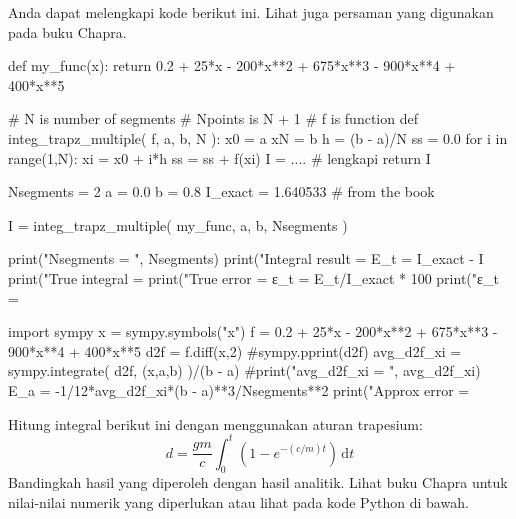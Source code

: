 Anda dapat melengkapi kode berikut ini. Lihat juga persaman yang digunakan pada
buku Chapra.
\begin{pythoncode}
def my_func(x):
    return 0.2 + 25*x - 200*x**2 + 675*x**3 - 900*x**4 + 400*x**5

# N is number of segments
# Npoints is N + 1
# f is function
def integ_trapz_multiple( f, a, b, N ):
    x0 = a
    xN = b
    h = (b - a)/N
    ss = 0.0
    for i in range(1,N):
        xi = x0 + i*h
        ss = ss + f(xi)
    I = .... # lengkapi
    return I

Nsegments = 2
a = 0.0
b = 0.8
I_exact = 1.640533 # from the book

I = integ_trapz_multiple( my_func, a, b, Nsegments )

print("Nsegments = ", Nsegments)
print("Integral result = %
E_t = I_exact - I
print("True integral   = %
print("True error      = %
ε_t = E_t/I_exact * 100
print("ε_t             = %

import sympy
x = sympy.symbols("x")
f = 0.2 + 25*x - 200*x**2 + 675*x**3 - 900*x**4 + 400*x**5
d2f = f.diff(x,2)
#sympy.pprint(d2f)
avg_d2f_xi = sympy.integrate( d2f, (x,a,b) )/(b - a)
#print("avg_d2f_xi = ", avg_d2f_xi)
E_a = -1/12*avg_d2f_xi*(b - a)**3/Nsegments**2
print("Approx error    = %
\end{pythoncode}

\begin{soal}
Hitung integral berikut ini dengan menggunakan aturan trapesium:
\begin{equation*}
d = \frac{gm}{c} \int_{0}^{t} (1 - e^{-(c/m)t}) \, \mathrm{d}t
\end{equation*}
Bandingkah hasil yang diperoleh dengan hasil analitik. Lihat buku Chapra untuk nilai-nilai
numerik yang diperlukan atau lihat pada kode Python di bawah.
\end{soal}

